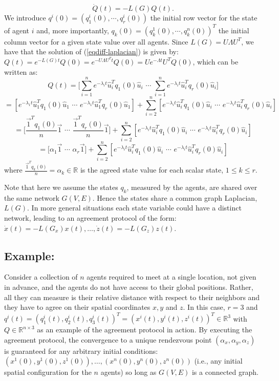 \documentclass{aims}
\theoremstyle{definition}
\begin{document}
\begin{equation}
\label{eqdiff-laplacian}
    \dot Q(t)=-L(G)Q(t).
\end{equation}
We introduce $q^i(0)=(q^i_1(0),\cdots, q^i_r(0))$ the initial row vector for the state of agent $i$ and, more importantly, $q_k(0)=(q_k^1(0),\cdots, q_k^n(0))^T$ the initial column vector for a given state value over all agents. Since $L(G)=U\Lambda U^T$, we have that the solution of (\ref{eqdiff-laplacian}) is given by:
$Q(t)=e^{-L(G)t}Q(0)=e^{-U\Lambda U^Tt}Q(0)=Ue^{-\Lambda t}U^TQ(0)$, which can be written as:
\begin{equation}
    Q(t)=\Bigg[\sum_{i=1}^n e^{-\lambda_it}\hat{u}_i^Tq_1(0)\hat{u}_i\,\,\cdots\,\,\sum_{i=1}^n e^{-\lambda_it}\hat{u}_i^Tq_r(0)\hat{u}_i\Bigg]
\end{equation}
$$
    =[e^{-\lambda_1t}\hat{u}_1^Tq_1(0)\hat{u}_1\,\,\cdots\,\,e^{-\lambda_1t}\hat{u}_1^Tq_r(0)\hat{u}_1]+\sum_{i=2}^n[e^{-\lambda_it}\hat{u}_i^Tq_1(0)\hat{u}_i\,\,\cdots\,\, e^{-\lambda_it}\hat{u}_i^Tq_r(0)\hat{u}_i]
$$
$$
    =\Bigg[\frac{\vec{1}^Tq_1(0)}{n}\vec{1}\,\,\cdots\,\,\frac{\vec{1}^Tq_r(0)}{n}\vec{1}\Bigg]+\sum_{i=2}^n[e^{-\lambda_it}\hat{u}_i^Tq_1(0)\hat{u}_i\,\,\cdots\,\, e^{-\lambda_it}\hat{u}_i^Tq_r(0)\hat{u}_i]
$$
\begin{equation}
    =\Big[\alpha_1\vec{1}\,\,\cdots\,\,\alpha_r\vec{1}\Big]+\sum_{i=2}^n[e^{-\lambda_it}\hat{u}_i^Tq_1(0)\hat{u}_i\,\,\cdots\,\, e^{-\lambda_it}\hat{u}_i^Tq_r(0)\hat{u}_i]
\end{equation}
where $\frac{\vec{1}^Tq_k(0)}{n}=\alpha_k\in\mathbb{R}$ is the
agreed state value for each scalar state, $1\leq k\leq r$.

Note that here we assume the states $q_k$, measured by the agents, are shared over the same network $G(V,E)$. Hence the states share a common graph Laplacian, $L(G)$. In more general situations each state variable could have a distinct network,  leading to an agreement protocol of the form: $\dot{x}(t)=-L(G_x)x(t),\dots,\dot{z}(t)=-L(G_z)z(t)$.
\subsection{Example:}
Consider a collection of $n$ agents required to meet at a single location, not given in advance, and the agents do not have access to their global positions. Rather, all they can measure is their relative
distance with respect to their neighbors and they have to agree on their spatial coordinates $x,y$ and $z$. In this case, $r=3$ and $q^i(t)=(q^i_1(t),q^i_2(t),q^i_3(t))^T=(x^i(t),y^i(t),z^i(t))^T\in\mathbb{R}^3$ with $Q\in\mathbb{R}^{n\times 3}$ as an example of the agreement protocol in action. By executing the agreement protocol, the convergence to a unique rendezvous point $(\alpha_x,\alpha_y,\alpha_z)$ is guaranteed
for any arbitrary initial conditions: $(x^1(0),y^1(0),z^1(0)),\dots,(x^n(0),y^n(0),z^n(0))$ (i.e., any initial spatial configuration for the $n$ agents)
so long as $G(V,E)$ is a connected graph.
\end{document}
